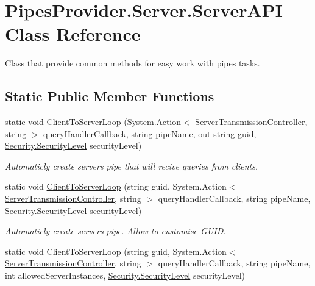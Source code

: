 \hypertarget{class_pipes_provider_1_1_server_1_1_server_a_p_i}{}\section{Pipes\+Provider.\+Server.\+Server\+A\+PI Class Reference}
\label{class_pipes_provider_1_1_server_1_1_server_a_p_i}


Class that provide common methods for easy work with pipes\textquotesingle{} tasks.  


\subsection*{Static Public Member Functions}
\begin{DoxyCompactItemize}
\item 
static void \mbox{\hyperlink{class_pipes_provider_1_1_server_1_1_server_a_p_i_a19601974715333ee85506d4abd322515}{Client\+To\+Server\+Loop}} (System.\+Action$<$ \mbox{\hyperlink{class_pipes_provider_1_1_server_1_1_server_transmission_controller}{Server\+Transmission\+Controller}}, string $>$ query\+Handler\+Callback, string pipe\+Name, out string guid, \mbox{\hyperlink{namespace_pipes_provider_1_1_security_a1a6020eca1c661a6f7140e8260502d7e}{Security.\+Security\+Level}} security\+Level)
\begin{DoxyCompactList}\small\item\em Automaticly create server\textquotesingle{}s pipe that will recive queries from clients. \end{DoxyCompactList}\item 
static void \mbox{\hyperlink{class_pipes_provider_1_1_server_1_1_server_a_p_i_a07ba6f0c9c72131049b47deefe687d3c}{Client\+To\+Server\+Loop}} (string guid, System.\+Action$<$ \mbox{\hyperlink{class_pipes_provider_1_1_server_1_1_server_transmission_controller}{Server\+Transmission\+Controller}}, string $>$ query\+Handler\+Callback, string pipe\+Name, \mbox{\hyperlink{namespace_pipes_provider_1_1_security_a1a6020eca1c661a6f7140e8260502d7e}{Security.\+Security\+Level}} security\+Level)
\begin{DoxyCompactList}\small\item\em Automaticly create server\textquotesingle{}s pipe. Allow to customise G\+U\+ID. \end{DoxyCompactList}\item 
static void \mbox{\hyperlink{class_pipes_provider_1_1_server_1_1_server_a_p_i_ad9a69115cf303bb3bddfc79a95e9b4d9}{Client\+To\+Server\+Loop}} (string guid, System.\+Action$<$ \mbox{\hyperlink{class_pipes_provider_1_1_server_1_1_server_transmission_controller}{Server\+Transmission\+Controller}}, string $>$ query\+Handler\+Callback, string pipe\+Name, int allowed\+Server\+Instances, \mbox{\hyperlink{namespace_pipes_provider_1_1_security_a1a6020eca1c661a6f7140e8260502d7e}{Security.\+Security\+Level}} security\+Level)

\end{DoxyCompactItemize}
